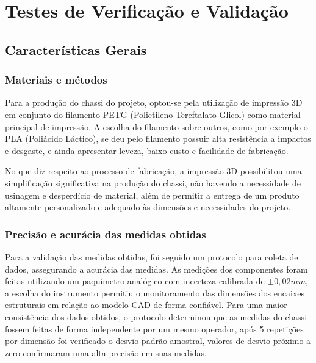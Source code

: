 \chapter{Testes de Verificação e Validação}

\section{Características Gerais}


\subsection{Materiais e métodos}

Para a produção do chassi do projeto, optou-se pela utilização de impressão 3D em conjunto do filamento PETG (Polietileno Tereftalato Glicol) como material principal de impressão. A escolha do filamento sobre outros, como por exemplo o PLA (Poliácido Láctico), se deu pelo filamento possuir alta resistência a impactos e desgaste, e ainda apresentar leveza, baixo custo e facilidade de fabricação.

No que diz respeito ao processo de fabricação, a impressão 3D possibilitou uma simplificação significativa na produção do chassi, não havendo a necessidade de usinagem e desperdício de material, além de permitir a entrega de um produto altamente personalizado e adequado às dimensões e necessidades do projeto.

\subsection{Precisão e acurácia das medidas obtidas}

Para a validação das medidas obtidas, foi seguido um protocolo para coleta de dados, assegurando a acurácia das medidas. As medições dos componentes foram feitas utilizando um paquímetro analógico com incerteza calibrada de $\pm 0,02 mm$, a escolha do instrumento permitiu o monitoramento das dimensões dos encaixes estruturais em relação ao modelo CAD de forma confiável. Para uma maior consistência dos dados obtidos, o protocolo determinou que as medidas do chassi fossem feitas de forma independente por um mesmo operador, após 5 repetições por dimensão foi verificado o desvio padrão amostral, valores de desvio próximo a zero confirmaram uma alta precisão em suas medidas.

